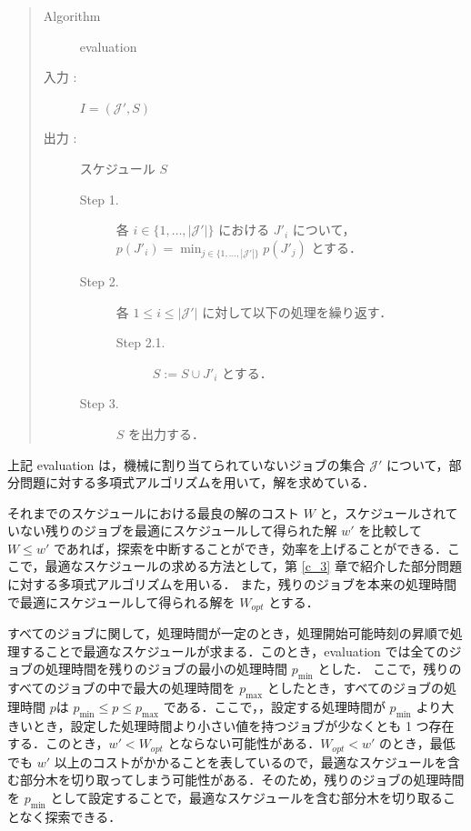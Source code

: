\documentclass[12pt]{optlab-bachelor}
\begin{document}
\begin{quote}
  \begin{description}
    \item[{\sc Algorithm}] {\sc evaluation}
    \item[入力 :] $I = (\mathcal{J'},S)$
    \item[出力 :] スケジュール $S$
    \begin{description}
      \item[Step 1.] 各 $i \in \{1,\ldots,|\mathcal{J}'|\}$ における $J'_i$ について，\\$p(J'_i) = \displaystyle \min_{j \in \{1,\ldots,|\mathcal{J}'|\}}p(J'_j)$ とする．
      \item[Step 2.] 各 $1 \le i \le |\mathcal{J}'|$ に対して以下の処理を繰り返す．
      \begin{description}
        \item[Step 2.1.] $S := S \cup J'_i$ とする．
      \end{description}
      \item[Step 3.] $S$ を出力する．
    \end{description}
  \end{description}
\end{quote}

上記 {\sc evaluation} は，機械に割り当てられていないジョブの集合 $\mathcal{J}'$ について，部分問題に対する多項式アルゴリズムを用いて，解を求めている．

それまでのスケジュールにおける最良の解のコスト $W$ と，スケジュールされていない残りのジョブを最適にスケジュールして得られた解 $w'$ を比較して $W \le w'$ であれば，探索を中断することができ，効率を上げることができる．ここで，最適なスケジュールの求める方法として，第 \ref{c_3} 章で紹介した部分問題に対する多項式アルゴリズムを用いる．
また，残りのジョブを本来の処理時間で最適にスケジュールして得られる解を $W_{opt}$ とする．

すべてのジョブに関して，処理時間が一定のとき，処理開始可能時刻の昇順で処理することで最適なスケジュールが求まる．このとき，{\sc evaluation} では全てのジョブの処理時間を残りのジョブの最小の処理時間 $p_{\min}$ とした．
ここで，残りのすべてのジョブの中で最大の処理時間を $p_{\max}$ としたとき，すべてのジョブの処理時間 $p$は $p_{\min} \le p \le p_{\max}$ である．ここで，，設定する処理時間が $p_{\min}$ より大きいとき，設定した処理時間より小さい値を持つジョブが少なくとも 1 つ存在する．このとき，$w' < W_{opt}$ とならない可能性がある．$W_{opt} < w'$ のとき，最低でも $w'$ 以上のコストがかかることを表しているので，最適なスケジュールを含む部分木を切り取ってしまう可能性がある．そのため，残りのジョブの処理時間を $p_{\min}$ として設定することで，最適なスケジュールを含む部分木を切り取ることなく探索できる．
\end{document}
